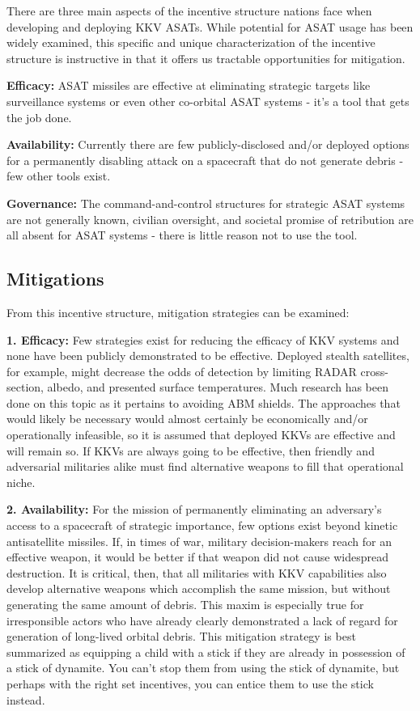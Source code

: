 There are three main aspects of the incentive structure nations face
when developing and deploying KKV ASATs.  While potential for ASAT
usage has been widely examined, this specific and unique
characterization of the incentive structure is instructive in that it
offers us tractable opportunities for mitigation.

\textbf{Efficacy:} ASAT missiles are effective at eliminating
strategic targets like surveillance systems or even other co-orbital
ASAT systems - it's a tool that gets the job done.

\textbf{Availability:} Currently there are few publicly-disclosed
and/or deployed options for a permanently disabling attack on a
spacecraft that do not generate debris - few other tools exist.

\textbf{Governance:} The command-and-control structures for strategic
ASAT systems are not generally known, civilian oversight, and societal
promise of retribution are all absent for ASAT systems - there is
little reason not to use the tool.

\subsection*{Mitigations}
From this incentive structure, mitigation strategies can be examined:

\textbf{1. Efficacy:} Few strategies exist for reducing the efficacy
of KKV systems and none have been publicly demonstrated to be
effective.  Deployed stealth satellites, for example, might decrease
the odds of detection by limiting RADAR cross-section, albedo, and
presented surface temperatures.  Much research has been done on this
topic as it pertains to avoiding ABM shields.  The approaches that
would likely be necessary would almost certainly be economically
and/or operationally infeasible, so it is assumed that deployed KKVs
are effective and will remain so.  If KKVs are always going to be
effective, then friendly and adversarial militaries alike must find
alternative weapons to fill that operational niche.

\textbf{2. Availability:} For the mission of permanently eliminating
an adversary's access to a spacecraft of strategic importance, few
options exist beyond kinetic antisatellite missiles.  If, in times of
war, military decision-makers reach for an effective weapon, it would
be better if that weapon did not cause widespread destruction.  It is
critical, then, that all militaries with KKV capabilities also develop
alternative weapons which accomplish the same mission, but without
generating the same amount of debris.  This maxim is especially true
for irresponsible actors who have already clearly demonstrated a lack
of regard for generation of long-lived orbital debris.  This
mitigation strategy is best summarized as equipping a child with a
stick if they are already in possession of a stick of dynamite.  You
can't stop them from using the stick of dynamite, but perhaps with the
right set incentives, you can entice them to use the stick instead.

